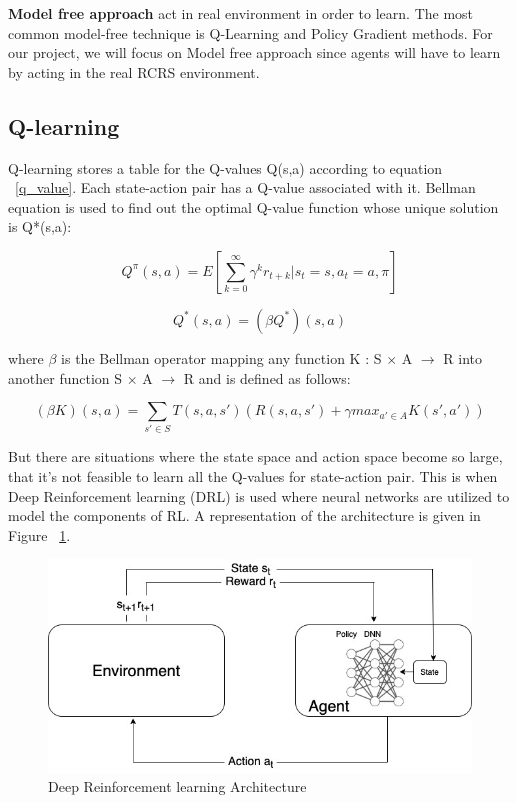 \documentclass[12pt]{report}
\begin{document}
\textbf{Model free approach} act in real environment in order to learn. The most common model-free technique is Q-Learning and Policy Gradient methods. For our project, we will focus on Model free approach since agents will have to learn by acting in the real RCRS environment. 

\subsection{Q-learning} Q-learning stores a table for the Q-values Q(s,a) according to equation ~\ref{q_value}. Each state-action pair has a Q-value associated with it. Bellman equation is used to find out the optimal Q-value function whose unique solution is Q*(s,a):

\begin{equation}\label{q_value}
	Q^\pi(s,a) = E[\sum_{k=0}^{\infty} \gamma^k r_{t+k} | s_t = s, a_t = a, \pi]
\end{equation}

\begin{equation}\label{q_value_2}
	Q^* (s,a) = (\beta Q^*) (s,a)
\end{equation}

where $\beta$ is the Bellman operator mapping any function K : S $\times$ A $\rightarrow$ R into another function S $\times$ A $\rightarrow$ R and is defined as follows: 

\begin{equation}\label{beta_eq}
	(\beta K)(s,a) = \sum_{s' \in S} T(s,a,s') (R(s,a,s') + \gamma max_{a'\in A} K (s', a'))  
\end{equation}

But there are situations where the state space and action space become so large, that it's not feasible to learn all the Q-values for state-action pair. This is when Deep Reinforcement learning (DRL) is used where neural networks are utilized to model the components of RL. A representation of the architecture is given in Figure ~\ref{fig:DRLArchitecture}. 

\begin{figure}[!h]
    \centering
    \includegraphics[width=12cm]{DRLAbstract.jpg}
    \caption{Deep Reinforcement learning Architecture}
    \label{fig:DRLArchitecture}
\end{figure}
\end{document}

